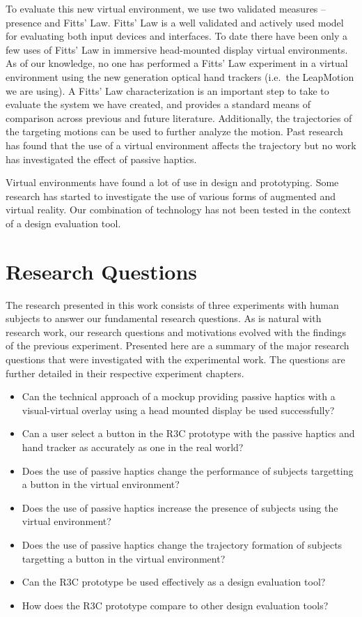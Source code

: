 To evaluate this new virtual environment, we use two validated measures -- presence and Fitts' Law.
Fitts' Law is a well validated and actively used model for evaluating both input devices and interfaces.
To date there have been only a few uses of Fitts' Law in immersive head-mounted display virtual environments.
As of our knowledge, no one has performed a Fitts' Law experiment in a virtual environment using the new generation optical hand trackers (i.e.\ the LeapMotion we are using).
A Fitts' Law characterization is an important step to take to evaluate the system we have created, and provides a standard means of comparison across previous and future literature.
Additionally, the trajectories of the targeting motions can be used to further analyze the motion.
Past research has found that the use of a virtual environment affects the trajectory but no work has investigated the effect of passive haptics.

Virtual environments have found a lot of use in design and prototyping.
Some research has started to investigate the use of various forms of augmented and virtual reality.
Our combination of technology has not been tested in the context of a design evaluation tool.

\section{Research Questions}
\label{hypotheses}

The research presented in this work consists of three experiments with human subjects to answer our fundamental research questions.
As is natural with research work, our research questions and motivations evolved with the findings of the previous experiment.
Presented here are a summary of the major research questions that were investigated with the experimental work.
The questions are further detailed in their respective experiment chapters.

\begin{itemize}
    \item Can the technical approach of a mockup providing passive haptics with a visual-virtual overlay using a head mounted display be used successfully?
    \item Can a user select a button in the R3C prototype with the passive haptics and hand tracker as accurately as one in the real world?
    \item Does the use of passive haptics change the performance of subjects targetting a button in the virtual environment?
    \item Does the use of passive haptics increase the presence of subjects using the virtual environment?
    \item Does the use of passive haptics change the trajectory formation of subjects targetting a button in the virtual environment?
    \item Can the R3C prototype be used effectively as a design evaluation tool?
    \item How does the R3C prototype compare to other design evaluation tools?
\end{itemize}

